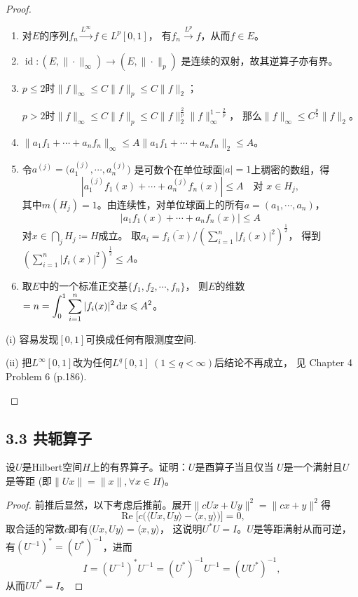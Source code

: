     \begin{proof}
    \begin{enumerate}[label=(\roman*)]
    \item 对$E$的序列$f_n\stackrel{L^\infty}{\longrightarrow}f\in L^p[0,1]$，
    有$f_n\stackrel{L^p}{\longrightarrow}f$，从而$f\in E$。
    \item $\operatorname{id}\colon(E,\|\cdot\|_\infty)\to(E,\|\cdot\|_p)$
    是连续的双射，故其逆算子亦有界。
    \item $p\leqslant2$时$\|f\|_\infty\leqslant C\|f\|_p\leqslant C\|f\|_2$；

    $p>2$时$\|f\|_\infty\leqslant C\|f\|_p\leqslant 
    C\|f\|_2^\frac{2}{p}\|f\|_\infty^{1-\frac{2}{p}}$，
    那么$\|f\|_\infty\leqslant C^\frac{p}{2}\|f\|_2$。
    \item $\|a_1f_1+\cdots+a_nf_n\|_\infty
    \leqslant A\|a_1f_1+\cdots+a_nf_n\|_2\leqslant A$。
    \item 令$a^{(j)}=\big(a_1^{(j)},\cdots,a_n^{(j)}\big)$
    是可数个在单位球面$|a|=1$上稠密的数组，得
    $$|a_1^{(j)}f_1(x)+\cdots+a_n^{(j)}f_n(x)|\leqslant A\quad\text{对 }x\in H_j,$$
    其中$m(H_j)=1$。由连续性，对单位球面上的所有$a=(a_1,\cdots,a_n)$，
    \[|a_1f_1(x)+\cdots+a_nf_n(x)|\leqslant A\]
    对$x\in\bigcap\limits_jH_j\coloneqq H$成立。
    取$\displaystyle a_i=\overline{f_i(x)}\bigg/\left(\sum_{i=1}^n|f_i(x)|^2\right)^{\frac{1}{2}}$，
    得到$\displaystyle\left(\sum_{i=1}^n|f_i(x)|^2\right)^\frac{1}{2}\leqslant A$。
    \item 取$E$中的一个标准正交基$\{f_1,f_2,\cdots,f_n\}$，
    则$E$的维数$\displaystyle=n=\int_0^1\sum_{i=1}^n|f_i(x)|^2\,{\rm d}x \leqslant A^2$。\qedhere
    \end{enumerate}
    \begin{remark*}
    (i) 容易发现$[0,1]$可换成任何有限测度空间.
    
    (ii) 把$L^{\infty}[0,1]$改为任何$L^q[0,1]\ (1\leqslant q<\infty)$后结论不再成立，
    见\cite{SS} Chapter 4 Problem 6 (p.186).
    \end{remark*}
    \end{proof}

\subsection{3.3 共轭算子}
\begin{6}
    设$U$是Hilbert空间$H$上的有界算子。证明：$U$是酉算子当且仅当
    $U$是一个满射且$U$是等距 (即$\|Ux\|=\|x\|,\forall x \in H$)。
\end{6}
\begin{proof}
    前推后显然，以下考虑后推前。展开$\|cUx+Uy\|^2=\|cx+y\|^2$得
    \[\operatorname{Re}\big[c\big(\langle Ux,Uy \rangle-\langle x,y \rangle\big)\big]=0,\]
    取合适的常数$c$即有$\langle Ux,Uy \rangle=\langle x,y \rangle$，
    这说明$U^*U=I$。$U$是等距满射从而可逆，有$(U^{-1})^*=(U^*)^{-1}$，进而
    \[I=(U^{-1})^*U^{-1}=(U^*)^{-1}U^{-1}=(UU^*)^{-1},\]
    从而$UU^*=I$。
\end{proof}

